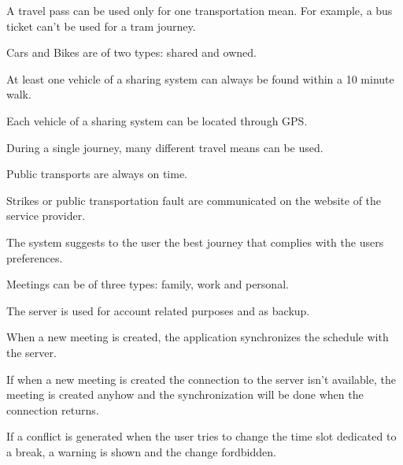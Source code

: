 \begin{list}
\item
A travel pass can be used only for one transportation mean. For example, a bus ticket can't be used for a tram journey.
\item
Cars and Bikes are of two types: shared and owned.
\item
At least one vehicle of a sharing system can always be found within a 10 minute walk.
\item
Each vehicle of a sharing system can be located through GPS.
\item
During a single journey, many different travel means can be used.
\item
Public transports are always on time.
\item
Strikes or public transportation fault are communicated on the website of the service provider. 
\item
The system suggests to the user the best journey that complies with the users preferences.
\item
Meetings can be of three types: family, work and personal.
\item
The server is used for account related purposes and as backup.
\item
When a new meeting is created, the application synchronizes the schedule with the server.
\item
If when a new meeting is created the connection to the server isn't available, the meeting is created anyhow and the synchronization will be done when the connection returns.
\item
If a conflict is generated when the user tries to change the time slot dedicated to a break, a warning is shown and the change fordbidden.
\end{list}